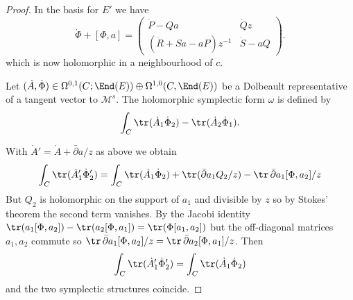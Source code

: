 \begin{proof}
	In the basis for $E'$ we have
	$$\dot\Phi+[\Phi,a]=\begin{pmatrix}  \dot P- Qa& \dot Q z\\
	(\dot R +Sa-aP)z^{-1}& \dot S-aQ\end{pmatrix}.$$
	which is now holomorphic in a neighbourhood of $c$.



	Let $(\dot A, \dot \Phi)\in \Omega^{0,1}(C;\End (E))\oplus \Omega^{1,0}(C,\End (E))$ be a Dolbeault representative of a tangent vector to ${\mathcal M}^s$. The holomorphic symplectic form $\omega$ is defined by
	$$\int_C\tr(\dot A_1\dot\Phi_2)-\tr(\dot A_2\dot\Phi_1).$$



	With $\dot A'=\dot A+\bar\partial  a/z$ as above we obtain
	$$ \int_C\tr(\dot A'_1\dot\Phi'_2)= \int_C\tr(\dot A_1\dot\Phi_2)+\tr (\bar\partial  a_1Q_2/z)-\tr \,\bar\partial  a_1[\Phi,a_2]/z$$
	But $Q_2$ is holomorphic on the support of $ a_1$ and divisible by $z$ so by Stokes' theorem the second term vanishes. By the Jacobi identity
	$\tr (a_1[\Phi,a_2])-\tr (a_2[\Phi,a_1])=\tr (\Phi[a_1,a_2])$ but the off-diagonal matrices $a_1,a_2$ commute so  $\tr\, \bar\partial  a_1[\Phi,a_2]/z=\tr \,\bar\partial  a_2[\Phi,a_1]/z$.
	Then
	$$ \int_C\tr(\dot A'_1\dot\Phi'_2)= \int_C\tr(\dot A_1\dot\Phi_2)$$
	and the two symplectic structures coincide.
\end{proof}

